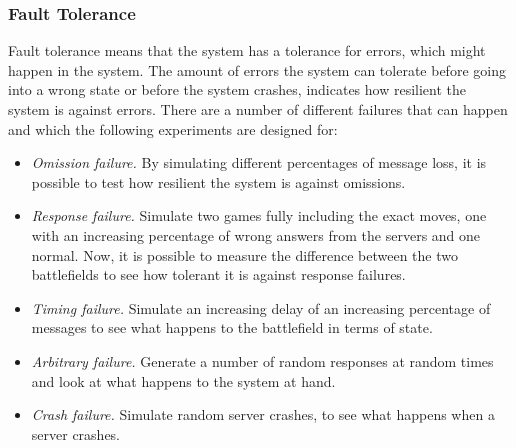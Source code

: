 \subsubsection{Fault Tolerance}
Fault tolerance means that the system has a tolerance for errors, which might happen in the system. The amount of errors the system can tolerate before going into a wrong state or before the system crashes, indicates how resilient the system is against errors. There are a number of different failures that can happen and which the following experiments are designed for:

\begin{itemize}
\item \emph{Omission failure.} By simulating different percentages of message loss, it is possible to test how resilient the system is against omissions.
\item \emph{Response failure.} Simulate two games fully including the exact moves, one with an increasing percentage of wrong answers from the servers and one normal. Now, it is possible to measure the difference between the two battlefields to see how tolerant it is against response failures. 
\item \emph{Timing failure.} Simulate an increasing delay of an increasing percentage of messages to see what happens to the battlefield in terms of state.
\item \emph{Arbitrary failure.} Generate a number of random responses at random times and look at what happens to the system at hand.
\item \emph{Crash failure.} Simulate random server crashes, to see what happens when a server crashes.
\end{itemize}

